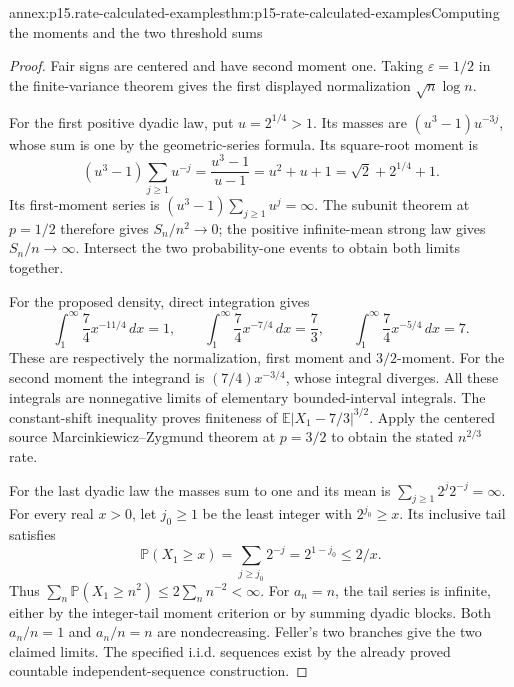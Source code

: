 \begin{annexitem}{annex:p15.rate-calculated-examples}{thm:p15-rate-calculated-examples}{Computing the moments and the two threshold sums}
\begin{proof}
Fair signs are centered and have second moment one. Taking
\(\varepsilon=1/2\) in the finite-variance theorem gives the first
displayed normalization \(\sqrt n\log n\).

For the first positive dyadic law, put \(u=2^{1/4}>1\).
Its masses are \((u^3-1)u^{-3j}\), whose sum is one by the
geometric-series formula. Its square-root moment is
\[
 (u^3-1)\sum_{j\geq1}u^{-j}
        =\frac{u^3-1}{u-1}=u^2+u+1
        =\sqrt2+2^{1/4}+1.
\]
Its first-moment series is
\((u^3-1)\sum_{j\geq1}u^j=\infty\).
The subunit theorem at \(p=1/2\) therefore gives \(S_n/n^2\to0\);
the positive infinite-mean strong law gives \(S_n/n\to\infty\).
Intersect the two probability-one events to obtain both limits together.

For the proposed density, direct integration gives
\[
 \int_1^\infty\frac74 x^{-11/4}\,dx=1,\qquad
 \int_1^\infty\frac74 x^{-7/4}\,dx=\frac73,\qquad
 \int_1^\infty\frac74 x^{-5/4}\,dx=7.
\]
These are respectively the normalization, first moment and
\(3/2\)-moment. For the second moment the integrand is
\((7/4)x^{-3/4}\), whose integral diverges. All these integrals
are nonnegative limits of elementary bounded-interval integrals.
The constant-shift inequality proves finiteness of
\(\mathbb E|X_1-7/3|^{3/2}\). Apply the centered source
Marcinkiewicz--Zygmund theorem at \(p=3/2\) to obtain the stated
\(n^{2/3}\) rate.

For the last dyadic law the masses sum to one and its mean is
\(\sum_{j\geq1}2^j2^{-j}=\infty\).
For every real \(x>0\), let \(j_0\geq1\) be the least integer
with \(2^{j_0}\geq x\). Its inclusive tail satisfies
\[
 \mathbb P(X_1\geq x)=\sum_{j\geq j_0}2^{-j}
                     =2^{1-j_0}\leq2/x.
\]
Thus \(\sum_n\mathbb P(X_1\geq n^2)\leq2\sum_nn^{-2}<\infty\).
For \(a_n=n\), the tail series is infinite, either by the
integer-tail moment criterion or by summing dyadic blocks.
Both \(a_n/n=1\) and \(a_n/n=n\) are nondecreasing. Feller's
two branches give the two claimed limits. The specified i.i.d.
sequences exist by the already proved countable independent-sequence
construction.
\end{proof}
\end{annexitem}

